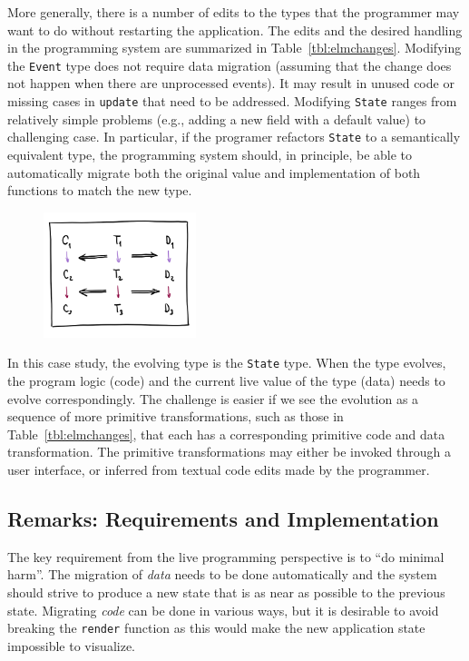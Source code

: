\documentclass[english,submission]{programming}
\DeclareRobustCommand{\frameworkbox}[1]{\leftbar#1\endleftbar}
\newcommand{\frameworkboxtitle}[1]{\noindent{\firamedium #1.}\quad}
\begin{document}
More generally, there is a number of edits to the types that the programmer may want to do
without restarting the application. The edits and the desired handling in the programming
system are summarized in Table~\ref{tbl:elmchanges}. Modifying the \texttt{Event} type does not
require data migration (assuming that the change does not happen when there are unprocessed
events). It may result in unused code or missing cases in \texttt{update} that need to be addressed.
Modifying \texttt{State} ranges from relatively simple problems (e.g., adding a new field with a
default value) to challenging case. In particular, if the programer refactors \texttt{State} to a
semantically equivalent type, the programming system should, in principle, be able to automatically
migrate both the original value and implementation of both functions to match the new type.

\frameworkbox{
\begin{figure}
\vspace{0em}
\includegraphics[width=12em]{figures/arr-steps.png}
\vspace{0em}
\end{figure}
\frameworkboxtitle{Primitive Type Transformations}
In this case study, the evolving type is the \texttt{State} type. When the type evolves,
the program logic (code) and the current live value of the type (data) needs to evolve
correspondingly. The challenge is easier if we see the evolution as a sequence of more primitive
transformations, such as those in Table~\ref{tbl:elmchanges}, that each has a corresponding
primitive code and data transformation. The primitive transformations may either be invoked
through a user interface, or inferred from textual code edits made by the programmer.
}

\subsection*{Remarks: Requirements and Implementation}
The key requirement from the live programming perspective is to ``do minimal harm''.
The migration of \emph{data} needs to be done automatically and the system should strive
to produce a new state that is as near as possible to the previous state. Migrating
\emph{code} can be done in various ways,
but it is desirable to avoid breaking the \texttt{render} function as this would make the
new application state impossible to visualize.
\end{document}
